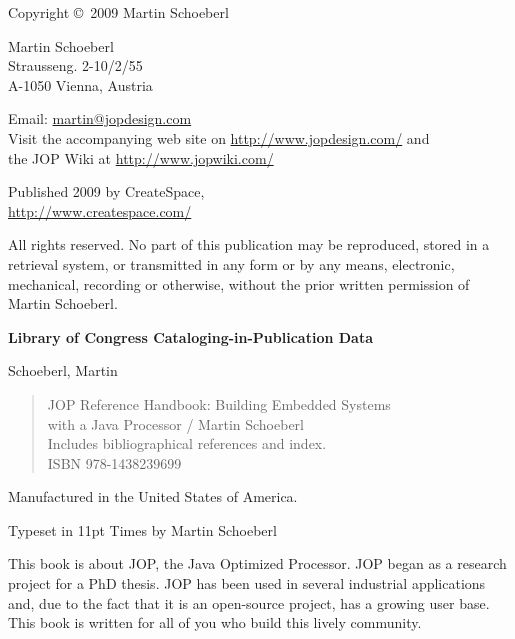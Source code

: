 \thispagestyle{empty}
\begin{flushleft}
{\small

Copyright \copyright \ 2009 Martin Schoeberl
\medskip

Martin Schoeberl\\
Strausseng. 2-10/2/55\\
A-1050 Vienna, Austria\\
\medskip

Email: \url{martin@jopdesign.com}\\
Visit the accompanying web site on \url{http://www.jopdesign.com/}
and\\
the JOP Wiki at \url{http://www.jopwiki.com/}
\medskip

Published 2009 by CreateSpace,\\
\url{http://www.createspace.com/}



\medskip


All rights reserved. No part of this publication may be reproduced,
stored in a retrieval system, or transmitted in any form or by any
means, electronic, mechanical, recording or otherwise, without the
prior written permission of Martin Schoeberl.
\medskip


\textbf{Library of Congress Cataloging-in-Publication Data}
\medskip

Schoeberl, Martin
\begin{quote}
    JOP Reference Handbook: Building Embedded Systems\\
    with a Java Processor / Martin Schoeberl\\
    Includes bibliographical references and index.\\
    ISBN 978-1438239699
\end{quote}

\bigskip


Manufactured in the United States of America.

Typeset in 11pt Times by Martin Schoeberl}
\end{flushleft}



This book is about JOP, the Java Optimized Processor. JOP began as a
research project for a PhD thesis. JOP has been used in several
industrial applications and, due to the fact that it is an
open-source project, has a growing user base. This book is written
for all of you who build this lively community.

